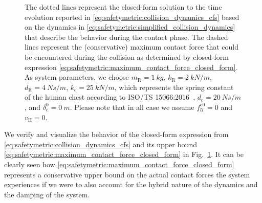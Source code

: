 \begin{figure}[ht]
{        The dotted lines represent the closed-form solution to the time evolution reported in \eqref{eq:safetymetric:collision_dynamics_cfs} based on the dynamics in \eqref{eq:safetymetric:simplified_collision_dynamics} that describe the behavior during the contact phase. The dashed lines represent the (conservative) maximum contact force that could be encountered during the collision as determined by closed-form expression \eqref{eq:safetymetric:maximum_contact_force_closed_form}. 
        As system parameters, we choose $m_\mathrm{R} = \SI{1}{kg}$, $k_\mathrm{R} = \SI{2}{kN \per m}$, $d_\mathrm{R} = \SI{4}{Ns \per m}$, $k_\mathrm{c} = \SI{25}{kN \per m}$, which represents the spring constant of the human chest according to ISO/TS 15066:2016~\citep{iso2016collaborative}, $d_\mathrm{c} = \SI{20}{Ns \per m}$, and $\delta_\mathrm{c}^0 = \SI{0}{m}$.
        Please note that in all case we assume $f_{\mathcal{U}}^{\mathrm{c}0} = 0$ and $v_\mathrm{H} = 0$.
    }
    \label{fig:safetymetric:closed_form_solution_verification}
\end{figure}

We verify and visualize the behavior of the closed-form expression from \eqref{eq:safetymetric:collision_dynamics_cfs} and its upper bound \eqref{eq:safetymetric:maximum_contact_force_closed_form} in Fig.~\ref{fig:safetymetric:closed_form_solution_verification}. It can be clearly seen how \eqref{eq:safetymetric:maximum_contact_force_closed_form} represents a conservative upper bound on the actual contact forces the system experiences if we were to also account for the hybrid nature of the dynamics and the damping of the system.

